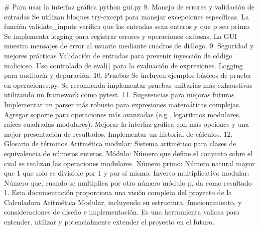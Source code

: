 # Para usar la interfaz gráfica
python gui.py
8. Manejo de errores y validación de entradas
Se utilizan bloques try-except para manejar excepciones específicas.
La función validate_inputs verifica que las entradas sean enteros y que p sea primo.
Se implementa logging para registrar errores y operaciones exitosas.
La GUI muestra mensajes de error al usuario mediante cuadros de diálogo.
9. Seguridad y mejores prácticas
Validación de entradas para prevenir inyección de código malicioso.
Uso controlado de eval() para la evaluación de expresiones.
Logging para auditoría y depuración.
10. Pruebas
Se incluyen ejemplos básicos de prueba en operaciones.py.
Se recomienda implementar pruebas unitarias más exhaustivas utilizando un framework como pytest.
11. Sugerencias para mejoras futuras
Implementar un parser más robusto para expresiones matemáticas complejas.
Agregar soporte para operaciones más avanzadas (e.g., logaritmos modulares, raíces cuadradas modulares).
Mejorar la interfaz gráfica con más opciones y una mejor presentación de resultados.
Implementar un historial de cálculos.
12. Glosario de términos
Aritmética modular: Sistema aritmético para clases de equivalencia de números enteros.
Módulo: Número que define el conjunto sobre el cual se realizan las operaciones modulares.
Número primo: Número natural mayor que 1 que solo es divisible por 1 y por sí mismo.
Inverso multiplicativo modular: Número que, cuando se multiplica por otro número módulo p, da como resultado 1.
Esta documentación proporciona una visión completa del proyecto de la Calculadora Aritmética Modular, incluyendo su estructura, funcionamiento, y consideraciones de diseño e implementación. Es una herramienta valiosa para entender, utilizar y potencialmente extender el proyecto en el futuro.
